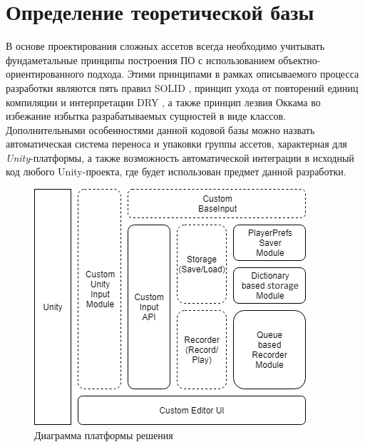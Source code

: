 \section{Определение теоретической базы}
В основе проектирования сложных ассетов всегда необходимо учитывать фундаметальные принципы построения ПО с использованием объектно-ориентированного подхода. Этими принципами в рамках описываемого процесса разработки являются пять правил SOLID \cite{solid}, принцип ухода от повторений единиц компиляции и интерпретации DRY \cite{dry}, а также принцип лезвия Оккама во избежание избытка разрабатываемых сущностей в виде классов. Дополнительными особенностями данной кодовой базы можно назвать автоматическая система переноса и упаковки группы ассетов, характерная для \textit{Unity}-платформы, а также возможность автоматической интеграции в исходный код любого Unity-проекта, где будет использован предмет данной разработки.

\begin{figure}[H]
	\centering
	\includegraphics[width=0.6\linewidth]{platform.png}
	\caption{Диаграмма платформы решения}
	\label{platform}
\end{figure}

